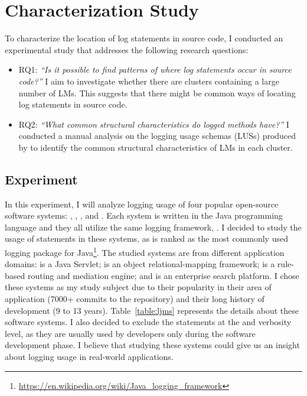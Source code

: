 \chapter{Characterization Study}\label{discover}\label{eval}

To characterize the location of log statements in source code, I conducted an experimental study that addresses the following research questions:

\begin{itemize} [leftmargin=.5in]
\item \textsc{RQ1: }\emph{``Is it possible to find patterns of where log statements occur in source code?''} I aim to investigate whether there are clusters containing a large number of LMs. This suggests that there might be common ways of locating log statements in source code.

\item \textsc{RQ2: }\emph{``What common structural characteristics do logged methods have?''} I conducted a manual analysis on the logging usage schemas (LUSs) produced by  to identify the common structural characteristics of LMs in each cluster.
\end{itemize}


\section{Experiment}  \label{setup-characterization}
In this experiment, I will analyze logging usage of four popular open-source software systems: , , , and . Each system is written in the Java programming language and they all utilize the same logging framework, . I decided to study the usage of  statements in these systems, as  is ranked as the most commonly used logging package for Java\footnote{\url{https://en.wikipedia.org/wiki/Java_logging_framework}}. The studied systems are from different application domains:  is a Java Servlet;  is an object relational-mapping framework;  is a rule-based routing and mediation engine; and  is an enterprise search platform. I chose these systems as my study subject due to their popularity in their area of application (7000+ commits to the  repository) and their long history of development (9 to 13 years). Table~\ref{table:ljms} represents the details about these software systems. I also decided to exclude the  statements at the  and  verbosity level, as they are usually used by developers only during the software development phase. I believe that studying these systems could give us an insight about logging usage in real-world applications.


